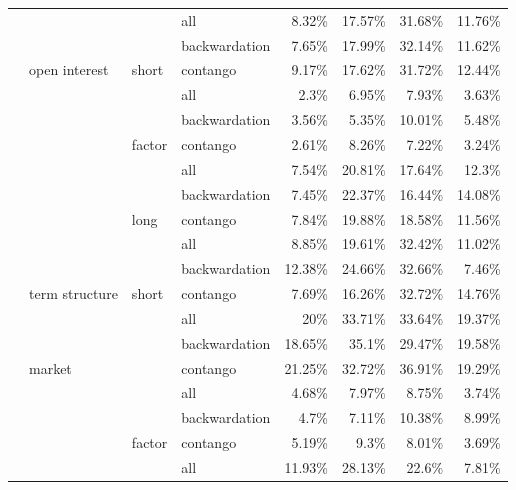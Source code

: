 \documentclass[]{elsarticle} %
\begin{document}
\begin{longtable}[t]{>{}llllrrrr}
\nopagebreak
 &  &  & all & 8.32\% & 17.57\% & 31.68\% & 11.76\%\\
\nopagebreak
 &  &  & backwardation & 7.65\% & 17.99\% & 32.14\% & 11.62\%\\
\nopagebreak
 & \multirow[t]{-9}{*}{\raggedright\arraybackslash open interest} & \multirow[t]{-3}{*}{\raggedright\arraybackslash short} & contango & 9.17\% & 17.62\% & 31.72\% & 12.44\%\\
\nopagebreak
 &  &  & all & 2.3\% & 6.95\% & 7.93\% & 3.63\%\\
\nopagebreak
 &  &  & backwardation & 3.56\% & 5.35\% & 10.01\% & 5.48\%\\
\nopagebreak
 &  & \multirow[t]{-3}{*}{\raggedright\arraybackslash factor} & contango & 2.61\% & 8.26\% & 7.22\% & 3.24\%\\
\nopagebreak
 &  &  & all & 7.54\% & 20.81\% & 17.64\% & 12.3\%\\
\nopagebreak
 &  &  & backwardation & 7.45\% & 22.37\% & 16.44\% & 14.08\%\\
\nopagebreak
 &  & \multirow[t]{-3}{*}{\raggedright\arraybackslash long} & contango & 7.84\% & 19.88\% & 18.58\% & 11.56\%\\
\nopagebreak
 &  &  & all & 8.85\% & 19.61\% & 32.42\% & 11.02\%\\
\nopagebreak
 &  &  & backwardation & 12.38\% & 24.66\% & 32.66\% & 7.46\%\\
\nopagebreak
\multirow[t]{-30}{*}{\raggedright\arraybackslash \textbf{open interest}} & \multirow[t]{-9}{*}{\raggedright\arraybackslash term structure} & \multirow[t]{-3}{*}{\raggedright\arraybackslash short} & contango & 7.69\% & 16.26\% & 32.72\% & 14.76\%\\
\cmidrule{1-8}\pagebreak[0]
 &  &  & all & 20\% & 33.71\% & 33.64\% & 19.37\%\\
\nopagebreak
 &  &  & backwardation & 18.65\% & 35.1\% & 29.47\% & 19.58\%\\
\nopagebreak
 & \multirow[t]{-3}{*}{\raggedright\arraybackslash market} &  & contango & 21.25\% & 32.72\% & 36.91\% & 19.29\%\\
\nopagebreak
 &  &  & all & 4.68\% & 7.97\% & 8.75\% & 3.74\%\\
\nopagebreak
 &  &  & backwardation & 4.7\% & 7.11\% & 10.38\% & 8.99\%\\
\nopagebreak
 &  & \multirow[t]{-6}{*}{\raggedright\arraybackslash factor} & contango & 5.19\% & 9.3\% & 8.01\% & 3.69\%\\
\nopagebreak
 &  &  & all & 11.93\% & 28.13\% & 22.6\% & 7.81\%\\

\end{longtable}
\end{document}
